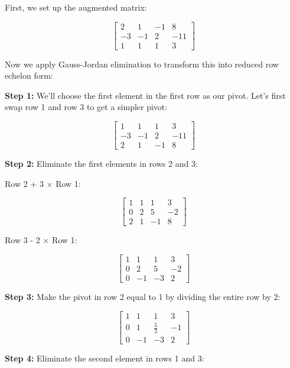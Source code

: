 First, we set up the augmented matrix:

\[
    \left[
    \begin{array}{ccc|c}
        2  & 1  & -1 & 8   \\
        -3 & -1 & 2  & -11 \\
        1  & 1  & 1  & 3
    \end{array}
    \right]
\]

Now we apply Gauss-Jordan elimination to transform this into reduced row echelon form:

\textbf{Step 1:} We'll choose the first element in the first row as our pivot. Let's first swap row 1 and row 3 to get a simpler pivot:

\[
    \left[
    \begin{array}{ccc|c}
        1  & 1  & 1  & 3   \\
        -3 & -1 & 2  & -11 \\
        2  & 1  & -1 & 8
    \end{array}
    \right]
\]

\textbf{Step 2:} Eliminate the first elements in rows 2 and 3:

Row 2 + 3 \(\times\) Row 1:

\[
    \left[
    \begin{array}{ccc|c}
        1 & 1 & 1  & 3  \\
        0 & 2 & 5  & -2 \\
        2 & 1 & -1 & 8
    \end{array}
    \right]
\]

Row 3 - 2 \(\times\) Row 1:

\[
    \left[
    \begin{array}{ccc|c}
        1 & 1  & 1  & 3  \\
        0 & 2  & 5  & -2 \\
        0 & -1 & -3 & 2
    \end{array}
    \right]
\]

\textbf{Step 3:} Make the pivot in row 2 equal to 1 by dividing the entire row by 2:

\[
    \left[
    \begin{array}{ccc|c}
        1 & 1  & 1           & 3  \\
        0 & 1  & \frac{5}{2} & -1 \\
        0 & -1 & -3          & 2
    \end{array}
    \right]
\]

\textbf{Step 4:} Eliminate the second element in rows 1 and 3:

